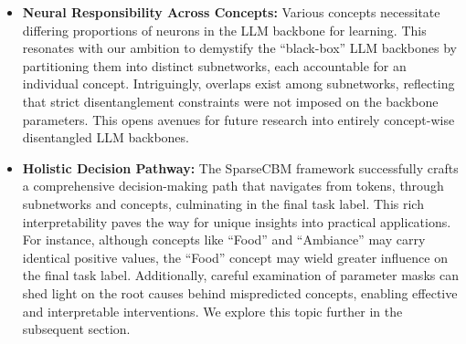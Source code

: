 \documentclass[letterpaper]{article} %
\begin{document}
\begin{itemize}
\item \textbf{Neural Responsibility Across Concepts:} Various concepts necessitate differing proportions of neurons in the LLM backbone for learning. This resonates with our ambition to demystify the ``black-box'' LLM backbones by partitioning them into distinct subnetworks, each accountable for an individual concept. Intriguingly, overlaps exist among subnetworks, reflecting that strict disentanglement constraints were not imposed on the backbone parameters. This opens avenues for future research into entirely concept-wise disentangled LLM backbones.
\item \textbf{Holistic Decision Pathway:} The SparseCBM framework successfully crafts a comprehensive decision-making path that navigates from tokens, through subnetworks and concepts, culminating in the final task label. This rich interpretability paves the way for unique insights into practical applications. For instance, although concepts like ``Food'' and ``Ambiance'' may carry identical positive values, the ``Food'' concept may wield greater influence on the final task label. Additionally, careful examination of parameter masks can shed light on the root causes behind mispredicted concepts, enabling effective and interpretable interventions. We explore this topic further in the subsequent section.
\end{itemize}
\end{document}
